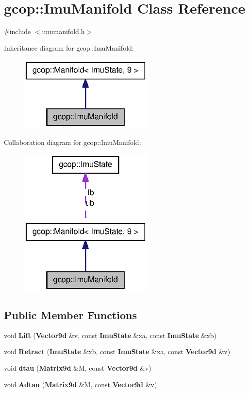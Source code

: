 \section{gcop\-:\-:\-Imu\-Manifold \-Class \-Reference}
\label{classgcop_1_1ImuManifold}


{\ttfamily \#include $<$imumanifold.\-h$>$}



\-Inheritance diagram for gcop\-:\-:\-Imu\-Manifold\-:
\nopagebreak
\begin{figure}[H]
\begin{center}
\leavevmode
\includegraphics[width=192pt]{classgcop_1_1ImuManifold__inherit__graph}
\end{center}
\end{figure}


\-Collaboration diagram for gcop\-:\-:\-Imu\-Manifold\-:
\nopagebreak
\begin{figure}[H]
\begin{center}
\leavevmode
\includegraphics[width=192pt]{classgcop_1_1ImuManifold__coll__graph}
\end{center}
\end{figure}
\subsection*{\-Public \-Member \-Functions}
\begin{DoxyCompactItemize}
\item 
void {\bf \-Lift} ({\bf \-Vector9d} \&v, const {\bf \-Imu\-State} \&xa, const {\bf \-Imu\-State} \&xb)
\item 
void {\bf \-Retract} ({\bf \-Imu\-State} \&xb, const {\bf \-Imu\-State} \&xa, const {\bf \-Vector9d} \&v)
\item 
void {\bf dtau} ({\bf \-Matrix9d} \&\-M, const {\bf \-Vector9d} \&v)
\item 
void {\bf \-Adtau} ({\bf \-Matrix9d} \&\-M, const {\bf \-Vector9d} \&v)
\end{DoxyCompactItemize}
